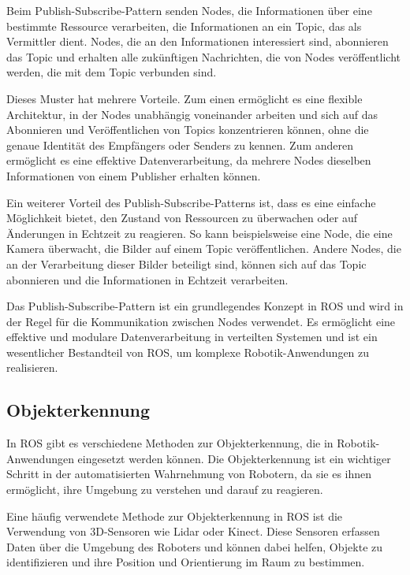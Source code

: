     Beim Publish-Subscribe-Pattern senden Nodes, die Informationen über eine bestimmte Ressource verarbeiten, die Informationen an ein Topic, das als Vermittler dient. Nodes, die an den Informationen interessiert sind, abonnieren das Topic und erhalten alle zukünftigen Nachrichten, die von Nodes veröffentlicht werden, die mit dem Topic verbunden sind.

    Dieses Muster hat mehrere Vorteile. Zum einen ermöglicht es eine flexible Architektur, in der Nodes unabhängig voneinander arbeiten und sich auf das Abonnieren und Veröffentlichen von Topics konzentrieren können, ohne die genaue Identität des Empfängers oder Senders zu kennen. Zum anderen ermöglicht es eine effektive Datenverarbeitung, da mehrere Nodes dieselben Informationen von einem Publisher erhalten können.

    Ein weiterer Vorteil des Publish-Subscribe-Patterns ist, dass es eine einfache Möglichkeit bietet, den Zustand von Ressourcen zu überwachen oder auf Änderungen in Echtzeit zu reagieren. So kann beispielsweise eine Node, die eine Kamera überwacht, die Bilder auf einem Topic veröffentlichen. Andere Nodes, die an der Verarbeitung dieser Bilder beteiligt sind, können sich auf das Topic abonnieren und die Informationen in Echtzeit verarbeiten.

    Das Publish-Subscribe-Pattern ist ein grundlegendes Konzept in \ac{ROS} und wird in der Regel für die Kommunikation zwischen Nodes verwendet. Es ermöglicht eine effektive und modulare Datenverarbeitung in verteilten Systemen und ist ein wesentlicher Bestandteil von \ac{ROS}, um komplexe Robotik-Anwendungen zu realisieren.

    \subsection{Objekterkennung} \label{objekterkennung:subsection}
    In \ac{ROS} gibt es verschiedene Methoden zur Objekterkennung, die in Robotik-Anwendungen eingesetzt werden können. Die Objekterkennung ist ein wichtiger Schritt in der automatisierten Wahrnehmung von Robotern, da sie es ihnen ermöglicht, ihre Umgebung zu verstehen und darauf zu reagieren.

    Eine häufig verwendete Methode zur Objekterkennung in \ac{ROS} ist die Verwendung von 3D-Sensoren wie Lidar oder Kinect. Diese Sensoren erfassen Daten über die Umgebung des Roboters und können dabei helfen, Objekte zu identifizieren und ihre Position und Orientierung im Raum zu bestimmen.


